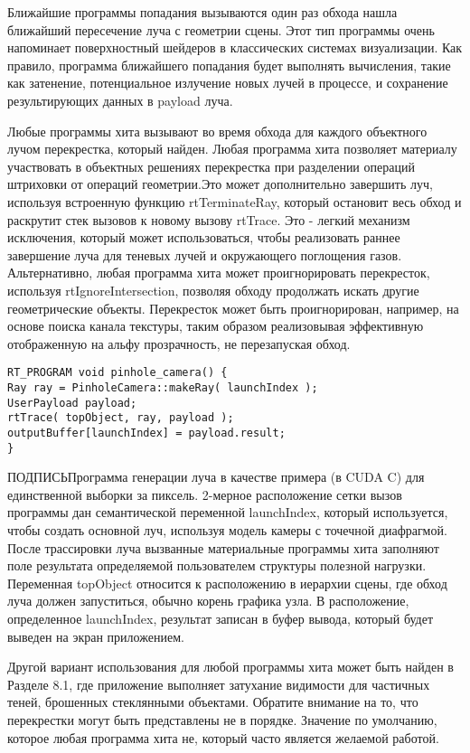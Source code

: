 Ближайшие программы попадания вызываются один раз обхода нашла ближайший  пересечение луча с геометрии сцены.
 Этот тип программы очень напоминает поверхностный шейдеров в классических системах визуализации.
 Как правило, программа ближайшего попадания будет выполнять вычисления, такие как затенение, потенциальное излучение новых лучей в процессе, и сохранение результирующих данных в payload луча.

Любые программы хита вызывают во время обхода для каждого объектного лучом перекрестка, который найден. Любая программа хита позволяет материалу участвовать в объектных решениях перекрестка при разделении операций штриховки от операций геометрии.Это может дополнительно завершить луч, используя встроенную функцию rtTerminateRay, который остановит весь обход и раскрутит стек вызовов к новому вызову rtTrace. Это - легкий механизм исключения, который может использоваться, чтобы реализовать раннее завершение луча для теневых лучей и окружающего поглощения газов. Альтернативно, любая программа хита может проигнорировать перекресток, используя rtIgnoreIntersection, позволяя обходу продолжать искать другие геометрические объекты. Перекресток может быть проигнорирован, например, на основе поиска канала текстуры, таким образом реализовывая эффективную отображенную на альфу прозрачность, не перезапуская обход.
\begin{verbatim}
RT_PROGRAM void pinhole_camera() {
Ray ray = PinholeCamera::makeRay( launchIndex );
UserPayload payload;
rtTrace( topObject, ray, payload );
outputBuffer[launchIndex] = payload.result;
}
\end{verbatim}
ПОДПИСЬ{Программа генерации луча в качестве примера (в CUDA C) для единственной выборки за пиксель. 2-мерное расположение сетки вызов программы дан семантической переменной launchIndex, который используется, чтобы создать основной луч, используя модель камеры с точечной диафрагмой. После трассировки луча вызванные материальные программы хита заполняют поле результата определяемой пользователем структуры полезной нагрузки. Переменная topObject относится к расположению в иерархии сцены, где обход луча должен запуститься, обычно корень графика узла. В
расположение, определенное launchIndex, результат записан в буфер вывода, который будет выведен на экран приложением.}


  Другой вариант использования для любой программы хита может быть найден в Разделе 8.1, где приложение выполняет затухание видимости для частичных теней, брошенных стеклянными объектами. Обратите внимание на то, что перекрестки могут быть представлены не в порядке. Значение по умолчанию, которое любая программа хита не, который часто является желаемой работой.

